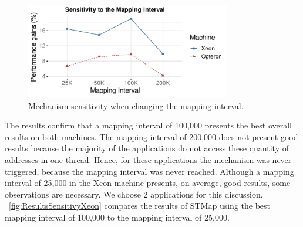 \begin{figure}[!ht]
	\centering
	\includegraphics[width=0.8\textwidth]{figures/sharingAwareThreadMapping/sensitivity/sensitivity.pdf}
	\caption{Mechanism sensitivity when changing the mapping interval.}
	\label{fig:sensitivity}
\end{figure}

The results confirm that a mapping interval of 100,000 presents the best overall results on both machines. The mapping interval of 200,000 does not present good results because the majority of the applications do not access these quantity of addresses in one thread. Hence, for these applications the mechanism was never triggered, because the mapping interval was never reached. Although a mapping interval of 25,000 in the Xeon machine presents, on average, good results, some observations are necessary. We choose 2 applications for this discussion. \figurename~\ref{fig:ResultsSensitivyXeon} compares the results of STMap using the best mapping interval of 100,000 to the mapping interval of 25,000.


